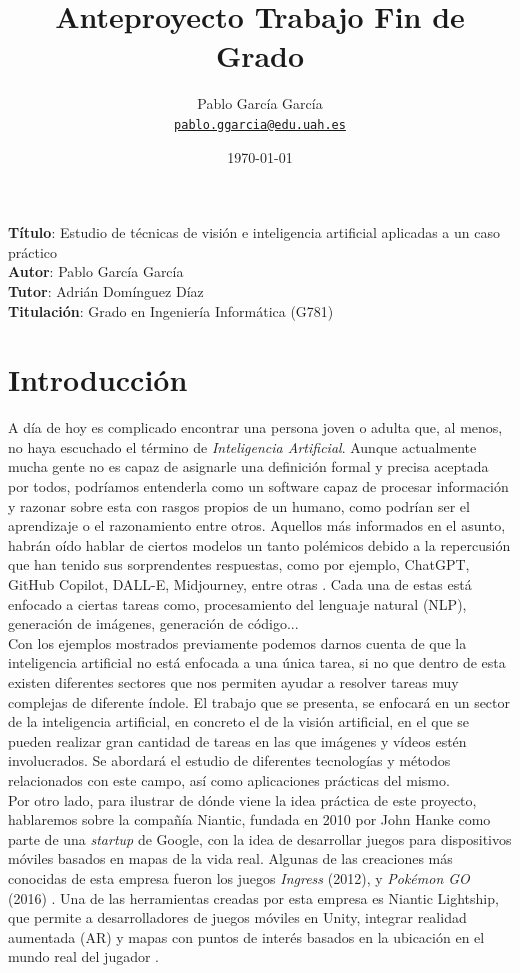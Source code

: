 \documentclass[12pt]{article}
\title{
	\textbf{Anteproyecto Trabajo Fin de Grado}
}
\author{
	Pablo García García\\
	{\small \href{mailto:pablo.ggarcia@edu.uah.es}{\texttt{pablo.ggarcia@edu.uah.es}}}
}
\date{
	\today
}
\begin{document}
	
	\maketitle
	
	\noindent \textbf{Título}: Estudio de técnicas de visión e inteligencia artificial aplicadas a un caso práctico\\
	\textbf{Autor}: Pablo García García\\
	\textbf{Tutor}: Adrián Domínguez Díaz\\
	\textbf{Titulación}: Grado en Ingeniería Informática (G781)\\
	
	\section{Introducción}
	
		A día de hoy es complicado encontrar una persona joven o adulta que, al menos, no haya escuchado el término de \textit{Inteligencia Artificial}. Aunque actualmente mucha gente no es capaz de asignarle una definición formal y precisa aceptada por todos, podríamos entenderla como un software capaz de procesar información y razonar sobre esta con rasgos propios de un humano, como podrían ser el aprendizaje o el razonamiento entre otros. Aquellos más informados en el asunto, habrán oído hablar de ciertos modelos un tanto polémicos debido a la repercusión que han tenido sus sorprendentes respuestas, como por ejemplo, ChatGPT, GitHub Copilot, DALL-E, Midjourney, entre otras \cite{ia}. Cada una de estas está enfocado a ciertas tareas como, procesamiento del lenguaje natural (NLP), generación de imágenes, generación de código... \\
		
		Con los ejemplos mostrados previamente podemos darnos cuenta de que la inteligencia artificial no está enfocada a una única tarea, si no que dentro de esta existen diferentes sectores que nos permiten ayudar a resolver tareas muy complejas de diferente índole. El trabajo que se presenta, se enfocará en un sector de la inteligencia artificial, en concreto el de la visión artificial, en el que se pueden realizar gran cantidad de tareas en las que imágenes y vídeos estén involucrados. Se abordará el estudio de diferentes tecnologías y métodos relacionados con este campo, así como aplicaciones prácticas del mismo. \\
		
		Por otro lado, para ilustrar de dónde viene la idea práctica de este proyecto, hablaremos sobre la compañía Niantic, fundada en 2010 por John Hanke como parte de una \textit{startup} de Google, con la idea de desarrollar juegos para dispositivos móviles basados en mapas de la vida real. Algunas de las creaciones más conocidas de esta empresa fueron los juegos \textit{Ingress} (2012), y \textit{Pokémon GO} (2016) \cite{niantic}. Una de las herramientas creadas por esta empresa es Niantic Lightship, que permite a desarrolladores de juegos móviles en Unity, integrar realidad aumentada (AR) y mapas con puntos de interés basados en la ubicación en el mundo real del jugador \cite{lightship}. \\
		
\end{document}

